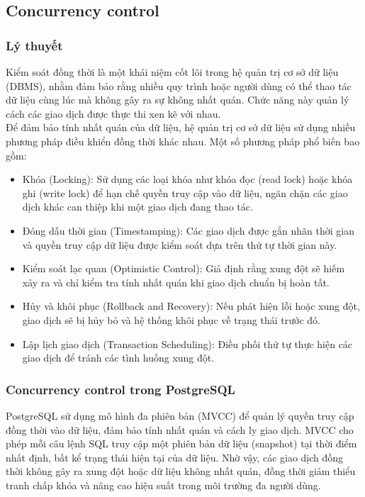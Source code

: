 \subsection{Concurrency control}
\subsubsection{Lý thuyết}
\indent Kiểm soát đồng thời là một khái niệm cốt lõi trong hệ quản trị cơ sở dữ liệu (DBMS), nhằm đảm bảo rằng nhiều quy trình hoặc người dùng có thể thao tác dữ liệu cùng lúc mà không gây ra sự không nhất quán. Chức năng này quản lý cách các giao dịch được thực thi xen kẽ với nhau.\\

Để đảm bảo tính nhất quán của dữ liệu, hệ quản trị cơ sở dữ liệu sử dụng nhiều phương pháp điều khiển đồng thời khác nhau. Một số phương pháp phổ biến bao gồm:
\begin{itemize}
    \item Khóa (Locking): Sử dụng các loại khóa như khóa đọc (read lock) hoặc khóa ghi (write lock) để hạn chế quyền truy cập vào dữ liệu, ngăn chặn các giao dịch khác can thiệp khi một giao dịch đang thao tác.
    \item Đóng dấu thời gian (Timestamping): Các giao dịch được gắn nhãn thời gian và quyền truy cập dữ liệu được kiểm soát dựa trên thứ tự thời gian này.
    \item Kiểm soát lạc quan (Optimistic Control): Giả định rằng xung đột sẽ hiếm xảy ra và chỉ kiểm tra tính nhất quán khi giao dịch chuẩn bị hoàn tất.
    \item Hủy và khôi phục (Rollback and Recovery): Nếu phát hiện lỗi hoặc xung đột, giao dịch sẽ bị hủy bỏ và hệ thống khôi phục về trạng thái trước đó.
    \item Lập lịch giao dịch (Transaction Scheduling): Điều phối thứ tự thực hiện các giao dịch để tránh các tình huống xung đột.
\end{itemize}
\subsubsection{Concurrency control trong PostgreSQL}
\indent
PostgreSQL sử dụng mô hình đa phiên bản (MVCC) để quản lý quyền truy cập đồng thời vào dữ liệu, đảm bảo tính nhất quán và cách ly giao dịch. MVCC cho phép mỗi câu lệnh SQL truy cập một phiên bản dữ liệu (snapshot) tại thời điểm nhất định, bất kể trạng thái hiện tại của dữ liệu. Nhờ vậy, các giao dịch đồng thời không gây ra xung đột hoặc dữ liệu không nhất quán, đồng thời giảm thiểu tranh chấp khóa và nâng cao hiệu suất trong môi trường đa người dùng.\\

